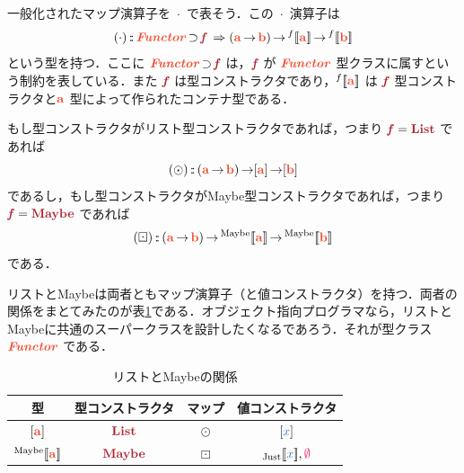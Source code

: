 \documentclass[a5paper,twoside,fleqn,draft]{jsbook}
\def\[{[\![}
\def\]{]\!]}
\def\constantColor{WildStrawberry}
\def\varColor{NavyBlue}
\def\typeColor{RedOrange}
\def\typeConstColor{Maroon}
\newcommand{\mTypeConstructor}[1]{\textcolor{\typeConstColor}{\textbf{\textit{#1}}}}
\newcommand{\mSpecialTypeConstructor}[1]{\textcolor{\typeConstColor}{\textbf{#1}}}
\DeclareMathOperator{\mSuperClass}{\;\Rightarrow\;}
\DeclareMathOperator{\mSuperSet}{\supset}
\newcommand{\mNothing}{\textcolor{\constantColor}{\emptyset}}
\newcommand{\mVar}[1]{\textcolor{\varColor}{#1}}
\newcommand{\mXVar}{\mVar{x}}
\DeclareMathOperator{\mFuncArrow}{\rightarrow}
\DeclareMathOperator{\mIn}{{:\!:}}
\DeclareMathOperator{\mMap}{\cdot}
\DeclareMathOperator{\mMapList}{\odot}
\DeclareMathOperator{\mMapMaybe}{\boxdot}
\newcommand{\mType}[1]{\textcolor{\typeColor}{\mathbf{#1}}}
\newcommand{\mA}{\mType{a}}
\newcommand{\mB}{\mType{b}}
\newcommand{\mTypeAssemble}[2]{{}^\mathrm{#1}\[\mType{#2}\]}
\newcommand{\mPolymorphicTypeAssemble}[2]{{}^{#1}\[\mType{#2}\]}
\newcommand{\mMaybeType}[1]{\mTypeAssemble{Maybe}{#1}}
\DeclareMathOperator{\mListTypeConstructor}{\mSpecialTypeConstructor{List}}
\DeclareMathOperator{\mMaybeTypeConstructor}{\mSpecialTypeConstructor{Maybe}}
\newcommand{\mValueConstructor}[1]{\mathrm{#1}}
\newcommand{\mValueWith}[2]{{}_\mValueConstructor{#1}\[\mVar{#2}\]}
\newcommand{\mJustWith}[1]{\mValueWith{Just}{#1}}
\newcommand{\mTypeClass}[1]{\textcolor{\typeColor}{\textbf{\textit{#1}}}}
\newcommand{\mFunctorTypeClass}{\mTypeClass{Functor}}
\begin{document}
一般化されたマップ演算子を $\mMap$ で表そう．この $\mMap$ 演算子は
\begin{equation}
  (\mMap)
  \mIn{}\mFunctorTypeClass
  \mSuperSet\mTypeConstructor{f}
  \mSuperClass(\mA\mFuncArrow\mB)
  \mFuncArrow\mPolymorphicTypeAssemble{f}{a}
  \mFuncArrow\mPolymorphicTypeAssemble{f}{b}
\end{equation}
という型を持つ．ここに $\mFunctorTypeClass\mSuperSet\mTypeConstructor{f}$ は，$\mTypeConstructor{f}$ が $\mFunctorTypeClass$ 型クラスに属すという制約を表している．また $\mTypeConstructor{f}$ は型コンストラクタであり，$\mPolymorphicTypeAssemble{f}{a}$ は $\mTypeConstructor{f}$ 型コンストラクタと$\mA$ 型によって作られたコンテナ型である．

もし型コンストラクタがリスト型コンストラクタであれば，つまり $\mTypeConstructor{f}=\mListTypeConstructor$ であれば
\begin{equation}
  (\mMapList)
  \mIn{}(\mA\mFuncArrow\mB)\mFuncArrow[\mA]\mFuncArrow[\mB]
\end{equation}
であるし，もし型コンストラクタがMaybe型コンストラクタであれば，つまり
$\mTypeConstructor{f}=\mMaybeTypeConstructor$ であれば
\begin{equation}
  (\mMapMaybe)
  \mIn{}(\mA\mFuncArrow\mB)\mFuncArrow\mMaybeType{a}\mFuncArrow\mMaybeType{b}
\end{equation}
である．

リストとMaybeは両者ともマップ演算子（と値コンストラクタ）を持つ．両者の関係をまとてみたのが表\ref{tab:list-and-maybe}である．オブジェクト指向プログラマなら，リストとMaybeに共通のスーパークラスを設計したくなるであろう．それが型クラス $\mFunctorTypeClass$ である．

\begin{table}
\label{tab:list-and-maybe}
\caption{リストとMaybeの関係}
\begin{center}
\begin{tabular}{||c|c|c|c||}\hline
型&型コンストラクタ&マップ&値コンストラクタ\\\hline\hline
$[\mA]$&$\mListTypeConstructor$&$\mMapList$&$[\mXVar]$\\
$\mMaybeType{a}$&$\mMaybeTypeConstructor$&$\mMapMaybe$&$\mJustWith{x},\mNothing$\\\hline
\end{tabular}
\end{center}
\end{table}

\end{document}
